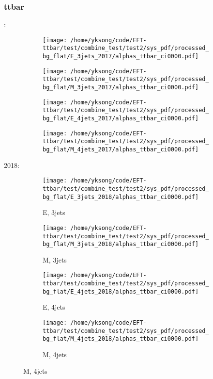 \documentclass{beamer}
\begin{document}
\begin{frame}
\frametitle{ttbar}
\fontsize{5}{1}:
\begin{figure}
\centering
\begin{subfigure}[b]{0.24\textwidth}
\texttt{[image: /home/yksong/code/EFT-ttbar/test/combine\_test/test2/sys\_pdf/processed\_bg\_flat/E\_3jets\_2017/alphas\_ttbar\_ci0000.pdf]}
\end{subfigure}
\begin{subfigure}[b]{0.24\textwidth}
\texttt{[image: /home/yksong/code/EFT-ttbar/test/combine\_test/test2/sys\_pdf/processed\_bg\_flat/M\_3jets\_2017/alphas\_ttbar\_ci0000.pdf]}
\end{subfigure}
\begin{subfigure}[b]{0.24\textwidth}
\texttt{[image: /home/yksong/code/EFT-ttbar/test/combine\_test/test2/sys\_pdf/processed\_bg\_flat/E\_4jets\_2017/alphas\_ttbar\_ci0000.pdf]}
\end{subfigure}
\begin{subfigure}[b]{0.24\textwidth}
\texttt{[image: /home/yksong/code/EFT-ttbar/test/combine\_test/test2/sys\_pdf/processed\_bg\_flat/M\_4jets\_2017/alphas\_ttbar\_ci0000.pdf]}
\end{subfigure}
\end{figure}
2018:
\begin{figure}
\centering
\begin{subfigure}[b]{0.24\textwidth}
\texttt{[image: /home/yksong/code/EFT-ttbar/test/combine\_test/test2/sys\_pdf/processed\_bg\_flat/E\_3jets\_2018/alphas\_ttbar\_ci0000.pdf]}
\captionsetup{font=tiny}
\caption{E, 3jets}
\end{subfigure}
\begin{subfigure}[b]{0.24\textwidth}
\texttt{[image: /home/yksong/code/EFT-ttbar/test/combine\_test/test2/sys\_pdf/processed\_bg\_flat/M\_3jets\_2018/alphas\_ttbar\_ci0000.pdf]}
\captionsetup{font=tiny}
\caption{M, 3jets}
\end{subfigure}
\begin{subfigure}[b]{0.24\textwidth}
\texttt{[image: /home/yksong/code/EFT-ttbar/test/combine\_test/test2/sys\_pdf/processed\_bg\_flat/E\_4jets\_2018/alphas\_ttbar\_ci0000.pdf]}
\captionsetup{font=tiny}
\caption{E, 4jets}
\end{subfigure}
\begin{subfigure}[b]{0.24\textwidth}
\texttt{[image: /home/yksong/code/EFT-ttbar/test/combine\_test/test2/sys\_pdf/processed\_bg\_flat/M\_4jets\_2018/alphas\_ttbar\_ci0000.pdf]}
\captionsetup{font=tiny}
\caption{M, 4jets}
\end{subfigure}
\end{figure}
\end{frame}
\end{document}

